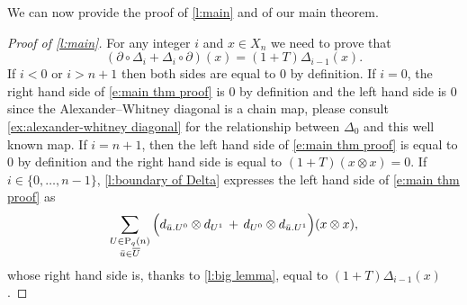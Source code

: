 We can now provide the proof of \cref{l:main} and of our main theorem.

\begin{proof}[Proof of \cref{l:main}]
	For any integer $i$ and $x \in X_n$ we need to prove that
	\begin{equation} \label{e:main thm proof}
	(\partial \circ \Delta_{i} + \Delta_{i} \circ \partial)(x) = (1 + T) \Delta_{i-1}(x).
	\end{equation}
	If $i < 0$ or $i > n+1$ then both sides are equal to $0$ by definition.
	If $i = 0$, the right hand side of \eqref{e:main thm proof} is $0$ by definition and the left hand side is $0$ since the Alexander--Whitney diagonal is a chain map, please consult \cref{ex:alexander-whitney diagonal} for the relationship between $\Delta_0$ and this well known map.
	If $i = n+1$, then the left hand side of \eqref{e:main thm proof} is equal to $0$ by definition and the right hand side is equal to $(1+T) (x \otimes x) = 0$.
	If $i \in \{0, \dots, n-1\}$, \cref{l:boundary of Delta} expresses the left hand side of \eqref{e:main thm proof} as
	\begin{equation*}
	\sum_{\substack{U \in \mathrm{P}_{q}(n) \\ {\bar{u}} \in \overline{U}}} \Big( d_{{\bar{u}}.U^0} \otimes d_{U^1} \, + \, d_{U^0} \otimes d_{{\bar{u}}.U^1} \Big) (x \otimes x),
	\end{equation*}
	whose right hand side is, thanks to \cref{l:big lemma}, equal to $(1+T)\Delta_{i-1}(x)$.
\end{proof}